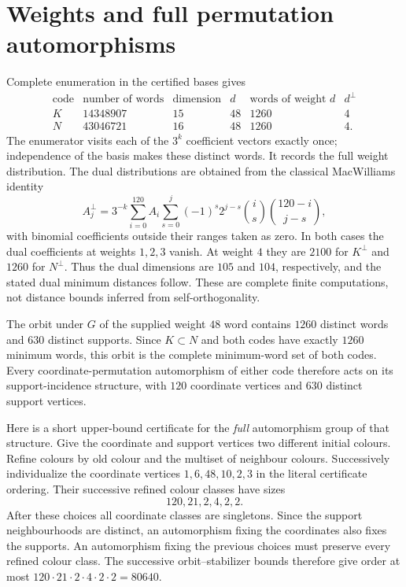 \documentclass[11pt,a4paper]{article}
\begin{document}
\section{Weights and full permutation automorphisms}
Complete enumeration in the certified bases gives
\[
\begin{array}{c|r|r|r|r|r}
\text{code}&\text{number of words}&\text{dimension}&d&\text{words of weight }d&d^\perp\\\hline
K&14348907&15&48&1260&4\\
N&43046721&16&48&1260&4.
\end{array}
\]
The enumerator visits each of the $3^k$ coefficient vectors exactly once;
independence of the basis makes these distinct words. It records the full
weight distribution. The dual distributions are obtained from the classical
MacWilliams identity
\[
 A_j^\perp=3^{-k}\sum_{i=0}^{120}A_i
 \sum_{s=0}^j(-1)^s2^{j-s}\binom{i}{s}\binom{120-i}{j-s},
\]
with binomial coefficients outside their ranges taken as zero. In both
cases the dual coefficients at weights $1,2,3$ vanish. At weight $4$ they are
$2100$ for $K^\perp$ and $1260$ for $N^\perp$. Thus the dual dimensions are $105$
and $104$, respectively, and the stated dual minimum distances follow.
These are complete finite computations, not distance bounds inferred from
self-orthogonality.

The orbit under $G$ of the supplied weight $4$8 word contains $1260$ distinct
words and $630$ distinct supports. Since $K\subset N$ and both codes have
exactly $1260$ minimum words, this orbit is the complete minimum-word set of
both codes. Every coordinate-permutation automorphism of either code
therefore acts on its support-incidence structure, with $120$ coordinate
vertices and $630$ distinct support vertices.

Here is a short upper-bound certificate for the \emph{full} automorphism
group of that structure. Give the coordinate and support vertices two
different initial colours. Refine colours by old colour and the multiset
of neighbour colours. Successively individualize the coordinate vertices
$1,6,48,10,2,3$ in the literal certificate ordering. Their successive
refined colour classes have sizes
\[
120,21,2,4,2,2.
\]
After these choices all coordinate classes are singletons. Since the support
neighbourhoods are distinct, an automorphism fixing the coordinates also
fixes the supports. An automorphism fixing the previous choices must
preserve every refined colour class. The successive orbit--stabilizer
bounds therefore give order at most
$120\cdot21\cdot2\cdot4\cdot2\cdot2=80640$.
\end{document}
